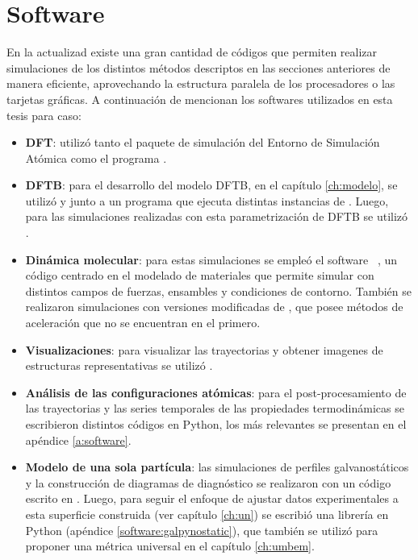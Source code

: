 \section{Software}

En la actualizad existe una gran cantidad de códigos que permiten realizar 
simulaciones de los distintos métodos descriptos en las secciones anteriores 
de manera eficiente, aprovechando la estructura paralela de los procesadores o 
las tarjetas gráficas. A continuación de mencionan los softwares utilizados 
en esta tesis para caso:
\begin{itemize}
    \item \textbf{DFT}: utilizó tanto el paquete de simulación  
        \cite{enkovaara2010, mortensen2005} del Entorno de Simulación Atómica 
        \cite{larsen2017} como el programa   
        \cite{quantum_espresso, quantum_espresso_advanced}.
    \item \textbf{DFTB}: para el desarrollo del modelo DFTB, en el capítulo 
        \ref{ch:modelo}, se utilizó  \cite{hotcent} y
         \cite{tango} junto a un programa  que ejecuta
        distintas instancias de . Luego, para las simulaciones 
        realizadas con esta parametrización de DFTB se utilizó  
        \cite{dftb+}.
    \item \textbf{Dinámica molecular}: para estas simulaciones se empleó el 
        software  ~\cite{lammps1, lammps2}, un código centrado en 
        el modelado de materiales que permite simular con distintos campos de 
        fuerzas, ensambles y condiciones de contorno. También se realizaron 
        simulaciones con versiones modificadas de  \cite{gems}, que 
        posee métodos de aceleración que no se encuentran en el primero.
    \item \textbf{Visualizaciones}: para visualizar las trayectorias y obtener 
        imagenes de estructuras representativas se utilizó  \cite{vmd}.
    \item \textbf{Análisis de las configuraciones atómicas}: para el 
        post-procesamiento de las trayectorias y las series temporales de  las
        propiedades termodinámicas se escribieron distintos códigos en Python,
        los más relevantes se presentan en el apéndice \ref{a:software}.
    \item \textbf{Modelo de una sola partícula}: las simulaciones de perfiles 
        galvanostáticos y la construcción de diagramas de diagnóstico se 
        realizaron con un código escrito en . Luego, para seguir el 
        enfoque de ajustar datos experimentales a esta superficie construida 
        (ver capítulo \ref{ch:un}) se escribió una librería en Python 
        (apéndice \ref{software:galpynostatic}), que también se utilizó para 
        proponer una métrica universal en el capítulo \ref{ch:umbem}.
\end{itemize}

